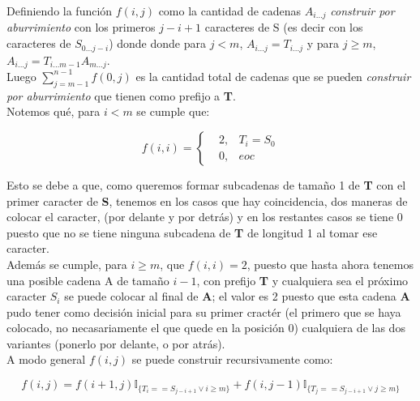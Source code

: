 \documentclass[a4paper]{article}
\begin{document}
    Definiendo la funci\'on $f(i,j)$ como la cantidad de cadenas $A_{i...j}$ \textit{construir por aburrimiento} con los primeros $j-i+1$ 
    caracteres de S (es decir con los caracteres de $S_{0...j-i}$) donde 
    donde para $j < m$, $A_{i...j} = T_{i...j}$ y para $j \geq m $, $A_{i...j} = T_{i...m-1}A_{m...j}$.\\ 
    
    Luego $\sum_{j= m-1}^{n-1}f(0,j)$ es la cantidad total de cadenas que se pueden \textit{construir por aburrimiento} que tienen como prefijo a \textbf{T}.\\
    
    Notemos qu\'e, para $i < m$ se cumple que: %

    \begin{equation*}
        f(i,i) = \left\{ \begin{aligned}
            &2, &T_i = S_0\\
            &0, &eoc
        \end{aligned} \right.
    \end{equation*}

    Esto se debe a que, como queremos formar subcadenas de tama\~no 1 de \textbf{T} con el primer caracter de \textbf{S}, tenemos en los casos que hay coincidencia, dos maneras de colocar el caracter, (por delante y por detr\'as) y en los restantes casos 
    se tiene 0 puesto que no se tiene ninguna subcadena de \textbf{T} de longitud 1 al tomar ese caracter.\\
    
    Adem\'as se cumple, para $i \geq m$, que $f(i,i) = 2$, puesto que hasta ahora tenemos una posible cadena A de tama\~no $i-1$, con prefijo \textbf{T} y cualquiera sea el pr\'oximo caracter 
    $S_i$ se puede colocar al final de \textbf{A}; el valor es 2 puesto que esta cadena \textbf{A} pudo tener como decisi\'on inicial para su primer cract\'er (el primero que se haya colocado, no necasariamente el que quede en la posici\'on 0) 
    cualquiera de las dos variantes (ponerlo por delante, o por atr\'as).\\ 

    A modo general $f(i,j)$ se puede construir recursivamente como: 

    \begin{equation*}
        f(i,j) = f(i+1,j)\mathbb{I}_{ \{T_i == S_{j-i+1} \vee i \geq m \}}  +  f(i,j-1)\mathbb{I}_{ \{T_j == S_{j-i+1} \vee j \geq m \} } 
    \end{equation*}
\end{document}
